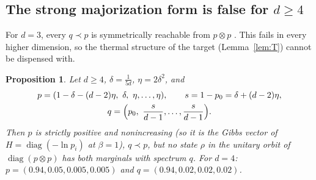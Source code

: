 \documentclass[11pt]{amsart}
\newtheorem{proposition}[lemma]{Proposition}
\theoremstyle{definition}
\theoremstyle{remark}
\numberwithin{equation}{section}
\newcommand{\diag}{\operatorname{diag}}
\begin{document}
\subsection{The strong majorization form is false for \texorpdfstring{$d\ge4$}{d >= 4}}
For $d=3$, every $q\prec p$ is symmetrically reachable from $p\otimes p$
\cite[Thm.~1]{BakhshinezhadEtAl2019}. This fails in every higher dimension, so the thermal structure of
the target (Lemma~\ref{lem:T}) cannot be dispensed with.

\begin{proposition}\label{prop:counterexample}
Let $d\ge4$, $\delta=\frac1{5d}$, $\eta=2\delta^2$, and
\begin{gather*}
  p=(1-\delta-(d-2)\eta,\ \delta,\ \eta,\dots,\eta),\qquad s=1-p_0=\delta+(d-2)\eta,\\
  q=\Bigl(p_0,\ \frac s{d-1},\dots,\frac s{d-1}\Bigr).
\end{gather*}
Then $p$ is strictly positive and nonincreasing (so it is the Gibbs vector of $H=\diag(-\ln p_i)$ at
$\beta=1$), $q\prec p$, but no state $\rho$ in the unitary orbit of $\diag(p\otimes p)$ has both marginals
with spectrum $q$. For $d=4$: $p=(0.94,0.05,0.005,0.005)$ and $q=(0.94,0.02,0.02,0.02)$.
\end{proposition}
\end{document}
